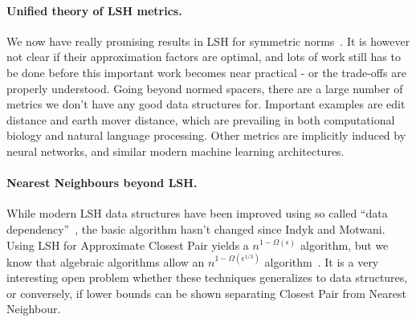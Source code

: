 \documentclass[10pt]{article}
\begin{document}
\paragraph{Unified theory of LSH metrics.}
We now have really promising results in LSH for symmetric norms~\cite{DBLP:journals/siamcomp/AndoniKR18}.
It is however not clear if their approximation factors are optimal, and lots of work still has to be done before this important work becomes near practical - or the trade-offs are properly understood.
Going beyond normed spacers, there are a large number of metrics we don’t have any good data structures for.
Important examples are edit distance and earth mover distance, which are prevailing in both computational biology and natural language processing.
Other metrics are implicitly induced by neural networks, and similar modern machine learning architectures.

\paragraph{Nearest Neighbours beyond LSH.}
While modern LSH data structures have been improved using so called ``data dependency''~\cite{DBLP:journals/corr/AndoniR15, DBLP:conf/stoc/AndoniNNRW18}, the basic algorithm hasn’t changed since Indyk and Motwani.
Using LSH for Approximate Closest Pair yields a $n^{1-\Omega(\epsilon)}$ algorithm, but we know that algebraic algorithms allow an $n^{1-\Omega(\epsilon^{1/3})}$ algorithm~\cite{DBLP:journals/corr/AlmanCW16}.
It is a very interesting open problem whether these techniques generalizes to data structures, or conversely, if lower bounds can be shown separating Closest Pair from Nearest Neighbour.



\end{document}
